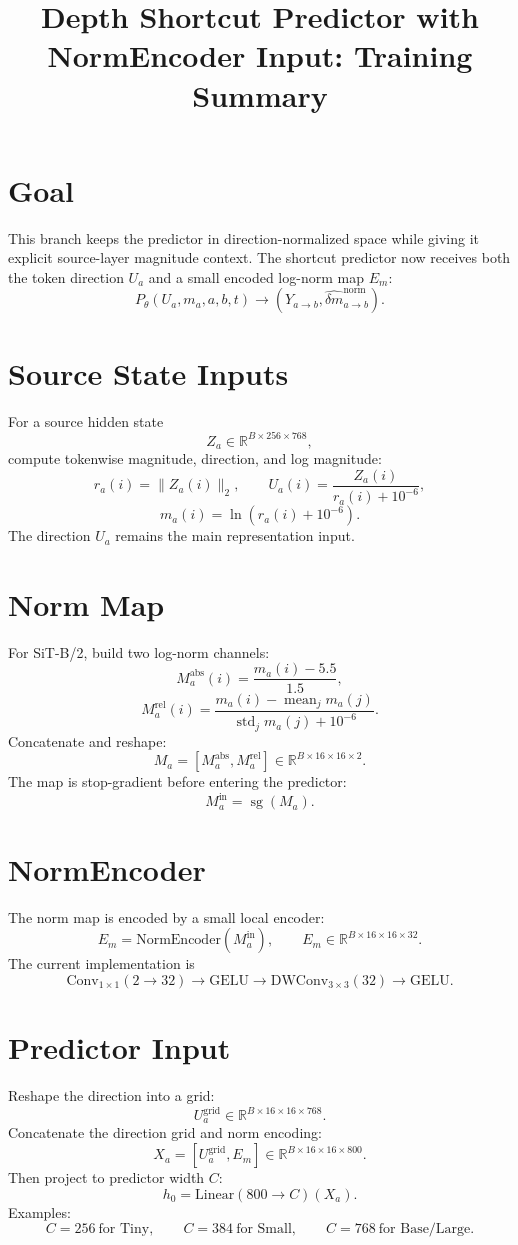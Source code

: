 \documentclass[11pt]{article}
\title{Depth Shortcut Predictor with NormEncoder Input: Training Summary}
\date{}
\begin{document}
\maketitle

\section{Goal}
This branch keeps the predictor in direction-normalized space while giving it
explicit source-layer magnitude context. The shortcut predictor now receives
both the token direction \(U_a\) and a small encoded log-norm map \(E_m\):
\[
    P_\theta(U_a,m_a,a,b,t)
    \rightarrow
    (Y_{a\rightarrow b}, \hat{\delta m}_{a\rightarrow b}^{\mathrm{norm}}).
\]

\section{Source State Inputs}
For a source hidden state
\[
    Z_a\in\mathbb{R}^{B\times256\times768},
\]
compute tokenwise magnitude, direction, and log magnitude:
\[
    r_a(i)=\|Z_a(i)\|_2,
    \qquad
    U_a(i)=\frac{Z_a(i)}{r_a(i)+10^{-6}},
\]
\[
    m_a(i)=\ln(r_a(i)+10^{-6}).
\]
The direction \(U_a\) remains the main representation input.

\section{Norm Map}
For SiT-B/2, build two log-norm channels:
\[
    M_a^{\mathrm{abs}}(i)=\frac{m_a(i)-5.5}{1.5},
\]
\[
    M_a^{\mathrm{rel}}(i)=
    \frac{m_a(i)-\operatorname{mean}_{j}m_a(j)}
    {\operatorname{std}_{j}m_a(j)+10^{-6}}.
\]
Concatenate and reshape:
\[
    M_a=[M_a^{\mathrm{abs}},M_a^{\mathrm{rel}}]
    \in\mathbb{R}^{B\times16\times16\times2}.
\]
The map is stop-gradient before entering the predictor:
\[
    M_a^{\mathrm{in}}=\operatorname{sg}(M_a).
\]

\section{NormEncoder}
The norm map is encoded by a small local encoder:
\[
    E_m=\mathrm{NormEncoder}(M_a^{\mathrm{in}}),
    \qquad
    E_m\in\mathbb{R}^{B\times16\times16\times32}.
\]
The current implementation is
\[
    \mathrm{Conv}_{1\times1}(2\to32)
    \rightarrow
    \mathrm{GELU}
    \rightarrow
    \mathrm{DWConv}_{3\times3}(32)
    \rightarrow
    \mathrm{GELU}.
\]

\section{Predictor Input}
Reshape the direction into a grid:
\[
    U_a^{\mathrm{grid}}\in\mathbb{R}^{B\times16\times16\times768}.
\]
Concatenate the direction grid and norm encoding:
\[
    X_a=[U_a^{\mathrm{grid}},E_m]
    \in\mathbb{R}^{B\times16\times16\times800}.
\]
Then project to predictor width \(C\):
\[
    h_0=\mathrm{Linear}(800\to C)(X_a).
\]
Examples:
\[
    C=256\ \text{for Tiny},\qquad
    C=384\ \text{for Small},\qquad
    C=768\ \text{for Base/Large}.
\]
\end{document}
